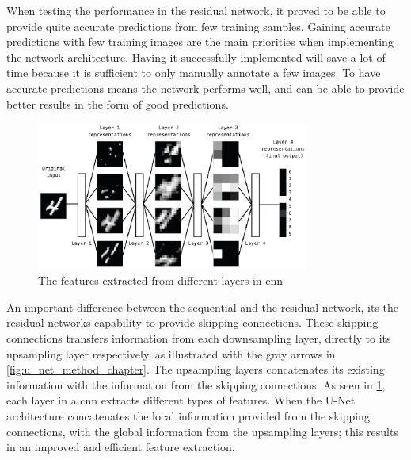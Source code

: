 \documentclass[USenglish]{ifimaster}  %
\begin{document}
When testing the performance in the residual network, it proved to be able to provide quite accurate predictions from few training samples. Gaining accurate predictions with few training images are the main priorities when implementing the network architecture. Having it successfully implemented will save a lot of time because it is sufficient to only manually annotate a few images. To have accurate predictions means the network performs well, and can be able to provide better results in the form of good predictions. 

\begin{figure}[H]
    \centering
    \includegraphics[width=0.8\textwidth]{bilder/layers_features.png}
    \caption{The features extracted from different layers in \ac{cnn} \cite{Francois_Deep_learning_with_python}}
    \label{fig:layers_features}
\end{figure}

An important difference between the sequential and the residual network, its the residual networks capability to provide skipping connections. These skipping connections transfers information from each downsampling layer, directly to its upsampling layer respectively, as illustrated with the gray arrows in \cref{fig:u_net_method_chapter}. The upsampling layers concatenates its existing information with the information from the skipping connections. As seen in \cref{fig:layers_features}, each layer in a \ac{cnn} extracts different types of features. When the U-Net architecture concatenates the local information provided from the skipping connections, with the global information from the upsampling layers; this results in an improved and efficient feature extraction.  
\end{document}
